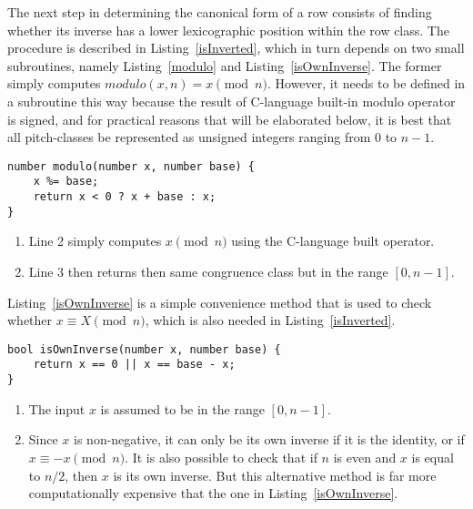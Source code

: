 The next step in determining the canonical form of a row consists of finding whether its inverse has a lower lexicographic position within the row class. The procedure is described in Listing~\ref{isInverted}, which in turn depends on two small subroutines, namely Listing~\ref{modulo} and Listing~\ref{isOwnInverse}. The former simply computes $modulo(x, n) = x \pmod{n}$. However, it needs to be defined in a subroutine this way because the result of C-language built-in modulo operator is signed, and for practical reasons that will be elaborated below, it is best that all pitch-classes be represented as unsigned integers ranging from $0$ to $n - 1$.

\begin{lstlisting}[caption={A subroutine to compute $x \pmod{n}$ such that the result is non-negative.},label={modulo}]
number modulo(number x, number base) {
    x %= base;
    return x < 0 ? x + base : x;
}
\end{lstlisting}

\begin{enumerate}
\addtocounter{enumi}{1}
\item Line 2 simply computes $x \pmod{n}$ using the C-language built operator.
\item Line 3 then returns then same congruence class but in the range $[0, n - 1]$.
\end{enumerate}

Listing~\ref{isOwnInverse} is a simple convenience method that is used to check whether $x \equiv X \pmod{n}$, which is also needed in Listing~\ref{isInverted}.

\begin{lstlisting}[caption={A subroutine that returns true if a pitch-class is its own inverse.},label={isOwnInverse}]
bool isOwnInverse(number x, number base) {
    return x == 0 || x == base - x;
}
\end{lstlisting}

\begin{enumerate}
\item The input $x$ is assumed to be in the range $[0, n - 1]$.
\item Since $x$ is non-negative, it can only be its own inverse if it is the identity, or if $x \equiv -x \pmod{n}$. It is also possible to check that if $n$ is even and $x$ is equal to $n / 2$, then $x$ is its own inverse. But this alternative method is far more computationally expensive that the one in Listing~\ref{isOwnInverse}.
\end{enumerate}

